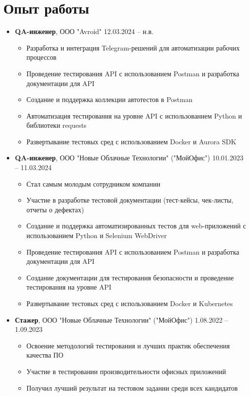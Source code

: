\documentclass[a4paper,11pt]{article}
\begin{document}
\section{Опыт работы}
\begin{itemize}[leftmargin=*]
  \item \textbf{QA-инженер}, ООО "Avroid" \hfill 12.03.2024 -- н.в.
  \begin{itemize}
    \item Разработка и интеграция Telegram-решений для автоматизации рабочих процессов
    \item Проведение тестирования API с использованием Postman и разработка документации для API
    \item Создание и поддержка коллекции автотестов в Postman
    \item Автоматизация тестирования на уровне API с использованием Python и библиотеки requests
    \item Развертывание тестовых сред с использованием Docker и Aurora SDK
  \end{itemize}

  \item \textbf{QA-инженер}, ООО "Новые Облачные Технологии" ("МойОфис") \hfill 10.01.2023 -- 11.03.2024
  \begin{itemize}
    \item Стал самым молодым сотрудником компании
    \item Участие в разработке тестовой документации (тест-кейсы, чек-листы, отчеты о дефектах)
    \item Создание и поддержка автоматизированных тестов для web-приложений с использованием Python и Selenium WebDriver
    \item Проведение тестирования API с использованием Postman и разработка документации для API
    \item Создание документации для тестирования безопасности и проведение тестирования на уровне API
    \item Развертывание тестовых сред с использованием Docker и Kubernetes
  \end{itemize}

  \item \textbf{Стажер}, ООО "Новые Облачные Технологии" ("МойОфис") \hfill 1.08.2022 -- 1.09.2023
  \begin{itemize}
    \item Освоение методологий тестирования и лучших практик обеспечения качества ПО
    \item Участие в тестировании производительности офисных приложений
    \item Получил лучший результат на тестовом задании среди всех кандидатов
  \end{itemize}
\end{itemize}
\end{document}
